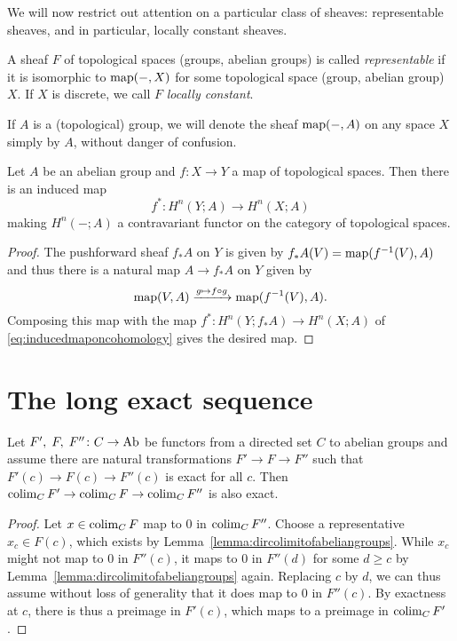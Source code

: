 \documentclass[a4paper,openany]{scrbook}
\begin{document}
We will now restrict out attention on a particular class of sheaves: representable sheaves, and in particular, locally constant sheaves.

\begin{defn}
A sheaf $F$ of topological spaces (groups, abelian groups) is called \emph{representable} if it is isomorphic to $\operatorname{map}(-,X)$ for some topological space (group, abelian group) $X$. If $X$ is discrete, we call $F$ \emph{locally constant}.
\end{defn}

If $A$ is a (topological) group, we will denote the sheaf $\operatorname{map}(-,A)$ on any space $X$ simply by $A$, without danger of confusion.

\begin{lemma}
Let $A$ be an abelian group and $f\colon X \to Y$ a map of topological spaces. Then there is an induced map
\[
f^*\colon H^n(Y;A) \to H^n(X;A)
\]
making $H^n(-;A)$ a contravariant functor on the category of topological spaces.
\end{lemma}
\begin{proof}
The pushforward sheaf $f_*A$ on $Y$ is given by $f_*A(V) = \operatorname{map}(f^{-1}(V),A)$ and thus there is a natural map $A \to f_*A$ on $Y$ given by
\[
\operatorname{map}(V,A) \xrightarrow{g \mapsto f \circ g} \operatorname{map}(f^{-1}(V),A).
\] 
Composing this map with the map $f^*\colon H^n(Y;f_*A) \to H^n(X;A)$ of \eqref{eq:inducedmaponcohomology} gives the desired map.
\end{proof}

\section{The long exact sequence}

\begin{lemma}\label{lemma:colimexact}
Let $F', \; F,\; F''\colon C \to \operatorname{Ab}$ be functors from a directed set $C$ to abelian groups and assume there are natural transformations $F' \to F \to F''$ such that $F'(c) \to F(c) \to F''(c) $ is exact for all $c$. Then $\operatorname*{colim}_C F' \to \operatorname*{colim}_C F \to \operatorname*{colim}_C F''$ is also exact.
\end{lemma}
\begin{proof}
Let $x \in \operatorname*{colim}_C F$ map to $0$ in $\operatorname*{colim}_C F''$. Choose a representative $x_c \in F(c)$, which exists by Lemma~\ref{lemma:dircolimitofabeliangroups}. While $x_c$ might not map to $0$ in $F''(c)$, it maps to $0$ in $F''(d)$ for some $d \geq c$ by Lemma~\ref{lemma:dircolimitofabeliangroups} again. Replacing $c$ by $d$, we can thus assume without loss of generality that it does map to $0$ in $F''(c)$. By exactness at $c$, there is thus a preimage in $F'(c)$, which maps to a preimage in $\operatorname*{colim}_C F'$.
\end{proof}
\end{document}
